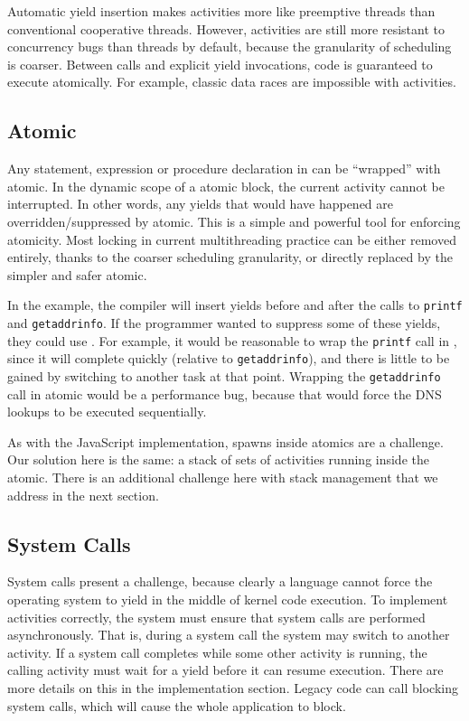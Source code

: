 \documentclass[sigplan,10pt,review,anonymous]{acmart}\settopmatter{printfolios=true,printccs=false,printacmref=false}
\begin{document}
Automatic yield insertion makes activities more like preemptive threads than conventional cooperative threads.
However, activities are still more resistant to concurrency bugs than threads by default, because the granularity of scheduling is coarser.
Between calls and explicit yield invocations, code is guaranteed to execute atomically.
For example, classic data races are impossible with activities.

\subsection{Atomic}
\label{sec:atomic}

Any statement, expression or procedure declaration in \charcoal{} can be ``wrapped'' with atomic.
In the dynamic scope of a atomic block, the current activity cannot be interrupted.
In other words, any yields that would have happened are overridden/suppressed by atomic.
This is a simple and powerful tool for enforcing atomicity.
Most locking in current multithreading practice can be either removed entirely, thanks to the coarser scheduling granularity, or directly replaced by the simpler and safer atomic.

In the example, the compiler will insert yields before and after the calls to \texttt{printf} and \texttt{getaddrinfo}.
If the programmer wanted to suppress some of these yields, they could use \atomic{}.
For example, it would be reasonable to wrap the \texttt{printf} call in \atomic{}, since it will complete quickly (relative to \texttt{getaddrinfo}), and there is little to be gained by switching to another task at that point.
Wrapping the \texttt{getaddrinfo} call in atomic would be a performance bug, because that would force the DNS lookups to be executed sequentially.

As with the JavaScript implementation, spawns inside atomics are a challenge.
Our solution here is the same: a stack of sets of activities running inside the atomic.
There is an additional challenge here with stack management that we address in the next section.

\subsection{System Calls}

System calls present a challenge, because clearly a language cannot force the operating system to yield in the middle of kernel code execution.
To implement activities correctly, the system must ensure that system calls are performed asynchronously.
That is, during a system call the system may switch to another activity.
If a system call completes while some other activity is running, the calling activity must wait for a yield before it can resume execution.
There are more details on this in the implementation section.
Legacy code can call blocking system calls, which will cause the whole application to block.
\end{document}
